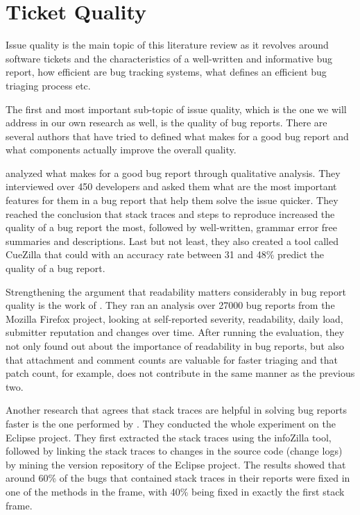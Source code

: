 \documentclass[11pt,english,twocolumn]{article}
\begin{document}
\section{Ticket Quality}
\label{sec:ticket-quality}

Issue quality is the main topic of this literature review as it revolves around
software tickets and the characteristics of a well-written and 
informative bug report, how efficient are bug tracking systems, what defines
an efficient bug triaging process etc. 

The first and most important sub-topic of issue quality, which is the one
we will address in our own research as well, is the quality of bug reports.
There are several authors that have tried to defined what makes for a good bug
report and what components actually improve the overall quality.

\cite{bettenburg2008makes} analyzed what 
makes for a good bug report through qualitative analysis. They interviewed over
450 developers and asked them what are the most important features for them in
a bug report that help them solve the issue quicker. They reached the conclusion 
that stack traces and steps to reproduce increased the quality of a bug report 
the most, followed by well-written, grammar error free summaries and 
descriptions. Last but not least, they also created a tool called CueZilla that 
could with an accuracy rate between 31 and 48\% predict the quality of a bug 
report. 

Strengthening the argument that readability matters considerably in bug report 
quality is the work of \cite{hooimeijer2007modeling}. They ran an analysis over
27000 bug reports from the Mozilla Firefox project, looking at self-reported 
severity, readability, daily load, submitter reputation and changes over time. 
After running the evaluation, they not only found out about the importance of
readability in bug reports, but also that attachment and comment counts are 
valuable for faster triaging and that patch count, for example, does not
contribute in the same manner as the previous two.

Another research that agrees that stack traces are helpful in solving bug
reports faster is the one performed by \cite{schroter2010stack}. They conducted
the whole experiment on the Eclipse project. They first extracted the stack
traces using the infoZilla tool\cite{bettenburg2008extracting}, followed by
linking the stack traces to changes in the source code (change logs) by mining
the version repository of the Eclipse project. The results showed that 
around 60\% of the bugs that contained stack traces in their reports were fixed
in one of the methods in the frame, with 40\% being fixed in exactly the first
stack frame.
\end{document}
